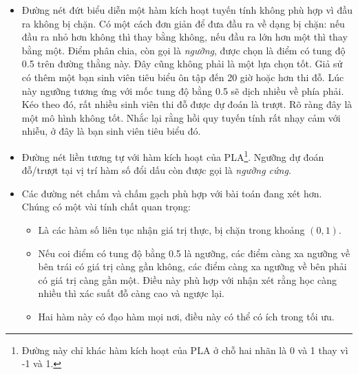\begin{itemize}
    \item Đường nét đứt biểu diễn một hàm kích hoạt tuyến tính không phù hợp vì
    đầu ra không bị chặn. Có một cách đơn giản để đưa đầu ra về dạng bị chặn:
    nếu đầu ra nhỏ hơn không thì thay bằng không, nếu đầu ra lớn hơn một thì
    thay bằng một. Điểm phân chia, còn gọi là \textit{ngưỡng}, được chọn là điểm
    có tung độ 0.5 trên đường thằng này. Đây cũng không phải là một lựa chọn
    tốt. Giả sử có thêm một bạn {sinh viên tiêu biểu} ôn tập đến 20 giờ hoặc hơn
    thi đỗ. Lúc này ngưỡng tương ứng với mốc tung độ bằng 0.5 sẽ dịch nhiều về phía
    phải. Kéo theo đó, rất nhiều sinh viên thi đỗ được dự đoán là trượt. Rõ ràng
    đây là một mô hình không tốt. Nhắc lại rằng hồi quy tuyến tính rất nhạy cảm
    với nhiễu, ở đây là bạn {sinh viên tiêu biểu} đó.%

    \item Đường nét liền tương tự với hàm kích hoạt của PLA\footnote{Đường này chỉ khác hàm kích hoạt của PLA ở chỗ hai nhãn là 0 và 1 thay vì -1 và 1.}. Ngưỡng dự đoán đỗ/trượt tại vị trí hàm số đổi dấu còn được gọi là \textit{ngưỡng cứng}.


    \item Các đường nét chấm và chấm gạch phù hợp với bài toán đang xét hơn. Chúng có một vài tính chất quan trọng:
     \begin{itemize}
        \item Là các hàm số liên tục nhận giá trị thực, bị chặn trong khoảng $(0, 1)$. 
        
        \item Nếu coi điểm có tung độ bằng 0.5 là ngưỡng, các điểm
        càng xa ngưỡng về bên trái có giá trị càng gần không, các
        điểm càng xa ngưỡng về bên phải có giá trị càng gần một. Điều này
        phù hợp với nhận xét rằng học càng nhiều thì xác suất đỗ càng cao
        và ngược lại.
        
        \item Hai hàm này có đạo hàm mọi nơi, điều này có thể có ích trong tối ưu.
     \end{itemize}
\end{itemize}
     
